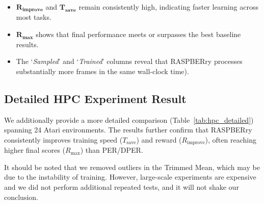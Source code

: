 \documentclass[10pt]{article} %
\begin{document}
\begin{itemize}[leftmargin=*]
    \item \(\mathbf{R_{\text{improve}}}\) and \(\mathbf{T_{\text{save}}}\) remain consistently high, indicating faster learning across most tasks.
    \item \(\mathbf{R_{\text{max}}}\) shows that final performance meets or surpasses the best baseline results.
    \item The `\emph{Sampled}' and `\emph{Trained}' columns reveal that RASPBERry processes substantially more frames in the same wall-clock time).
\end{itemize}

\subsection{Detailed HPC Experiment Result}
We additionally provide a more detailed comparison (Table~\ref{tab:hpc_detailed}) spanning 24 Atari environments.
The results further confirm that RASPBERry consistently improves training speed ($T_{\text{save}}$) and reward ($R_{\text{improve}}$), often reaching higher final scores ($R_{\text{max}}$) than PER/DPER.

It should be noted that we removed outliers in the Trimmed Mean, which may be due to the instability of training. 
However, large-scale experiments are expensive and we did not perform additional repeated tests, and it will not shake our conclusion.
\end{document}
